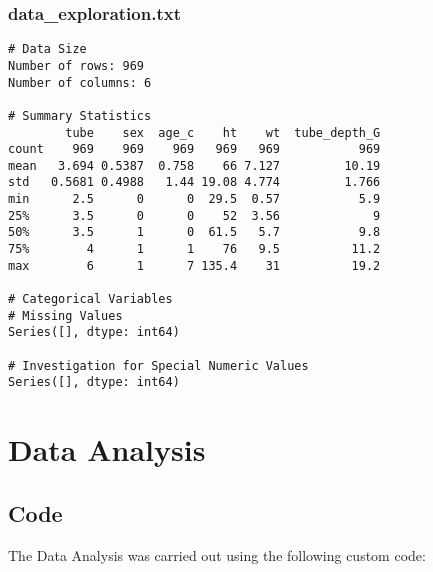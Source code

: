 \documentclass[11pt]{article}
\begin{document}
\subsubsection*{data\_exploration.txt}

\begin{Verbatim}[tabsize=4]
# Data Size
Number of rows: 969
Number of columns: 6

# Summary Statistics
        tube    sex  age_c    ht    wt  tube_depth_G
count    969    969    969   969   969           969
mean   3.694 0.5387  0.758    66 7.127         10.19
std   0.5681 0.4988   1.44 19.08 4.774         1.766
min      2.5      0      0  29.5  0.57           5.9
25%      3.5      0      0    52  3.56             9
50%      3.5      1      0  61.5   5.7           9.8
75%        4      1      1    76   9.5          11.2
max        6      1      7 135.4    31          19.2

# Categorical Variables
# Missing Values
Series([], dtype: int64)

# Investigation for Special Numeric Values
Series([], dtype: int64)

\end{Verbatim}

\section{Data Analysis}
\subsection{{Code}}
The Data Analysis was carried out using the following custom code:
\end{document}
